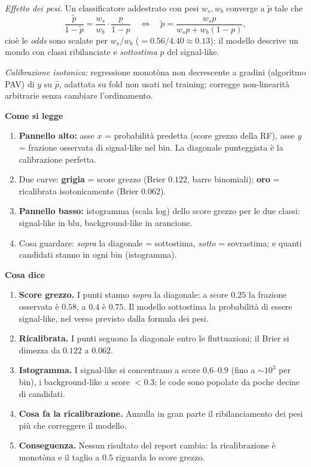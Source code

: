\documentclass[10.5pt,a4paper]{article}
\newcommand{\sez}[1]{\par\Needspace{6\baselineskip}\medskip\noindent\textbf{\large #1}\par\nopagebreak\smallskip}
\begin{document}
\emph{Effetto dei pesi.} Un classificatore addestrato con pesi $w_s,w_b$ converge a $\tilde p$ tale che
\[
\frac{\tilde p}{1-\tilde p}=\frac{w_s}{w_b}\cdot\frac{p}{1-p}\quad\Longleftrightarrow\quad \tilde p=\frac{w_sp}{w_sp+w_b(1-p)},
\]
cioè le \emph{odds} sono scalate per $w_s/w_b$ ($=0.56/4.40\approx0.13$): il modello descrive un mondo con classi ribilanciate e \emph{sottostima} $p$ del signal-like.

\emph{Calibrazione isotonica:} regressione monotòna non decrescente a gradini (algoritmo PAV) di $y$ su $\hat p$, adattata su fold non usati nel training: corregge non-linearità arbitrarie senza cambiare l'ordinamento.

\sez{Come si legge}
\begin{enumerate}
\item \textbf{Pannello alto:} asse $x$ = probabilità predetta (score grezzo della RF), asse $y$ = frazione osservata di signal-like nel bin. La diagonale punteggiata è la calibrazione perfetta.
\item Due curve: \textbf{grigia} = score grezzo (Brier $0.122$, barre binomiali); \textbf{oro} = ricalibrata isotonicamente (Brier $0.062$).
\item \textbf{Pannello basso:} istogramma (scala log) dello score grezzo per le due classi: signal-like in blu, background-like in arancione.
\item Cosa guardare: \emph{sopra} la diagonale = sottostima, \emph{sotto} = sovrastima; e quanti candidati stanno in ogni bin (istogramma).
\end{enumerate}

\sez{Cosa dice}
\begin{enumerate}
\item \textbf{Score grezzo.} I punti stanno \emph{sopra} la diagonale: a score $0.25$ la frazione osservata è $0.58$, a $0.4$ è $0.75$. Il modello sottostima la probabilità di essere signal-like, nel verso previsto dalla formula dei pesi.
\item \textbf{Ricalibrata.} I punti seguono la diagonale entro le fluttuazioni; il Brier si dimezza da $0.122$ a $0.062$.
\item \textbf{Istogramma.} I signal-like si concentrano a score $0.6$--$0.9$ (fino a $\sim10^3$ per bin), i background-like a score $<0.3$; le code sono popolate da poche decine di candidati.
\item \textbf{Cosa fa la ricalibrazione.} Annulla in gran parte il ribilanciamento dei pesi più che correggere il modello.
\item \textbf{Conseguenza.} Nessun risultato del report cambia: la ricalibrazione è monotòna e il taglio a $0.5$ riguarda lo score grezzo.
\end{enumerate}
\end{document}
